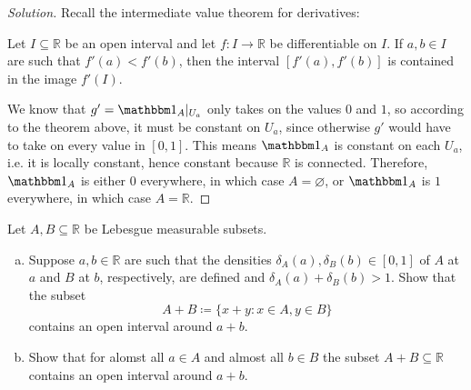 \documentclass[10pt]{article}
\providecommand{\RR}{\mathbb R}
\providecommand{\ind}{\mathbbm 1}
\providecommand{\ii}{\item}
\newenvironment{soln}{\begin{proof}[Solution]}{\end{proof}}
\begin{document}
\begin{soln}
    Recall the intermediate value theorem for derivatives:
    \begin{theorem*}
        Let $I\subseteq\RR$ be an open interval and let
	$f\colon I\to\RR$ be differentiable on $I$.
	If $a,b\in I$ are such that $f'(a)<f'(b)$,
	then the interval $[f'(a),f'(b)]$ is contained in the image $f'(I)$.
    \end{theorem*}
    We know that $g' = \ind_A|_{U_a}$ only takes on the values $0$ and $1$, so
    according to the theorem above, it must be constant on $U_a$,
    since otherwise $g'$ would have to take on every value in $[0,1]$.
    This means $\ind_A$ is constant on each $U_a$,
    i.e. it is locally constant, hence constant because $\RR$ is connected.
    Therefore, $\ind_A$ is either $0$ everywhere, in which case $A = \varnothing$,
    or $\ind_A$ is $1$ everywhere, in which case $A = \RR$.
\end{soln}

\begin{problem}
    Let $A,B\subseteq\RR$ be Lebesgue measurable subsets.
    \begin{enumerate}[(a)]
        \ii Suppose $a,b\in\RR$ are such that the densities
	$\delta_A(a),\delta_B(b)\in[0,1]$ of $A$ at $a$ and $B$ at $b$,
	respectively, are defined and $\delta_A(a) + \delta_B(b) > 1$.
	Show that the subset
	\begin{equation*}
	    A + B \coloneq \{ x + y : x\in A, y\in B \}
	\end{equation*}
	contains an open interval around $a+b$.
	\ii Show that for alomst all $a\in A$ and almost all $b\in B$
	the subset $A+B\subseteq\RR$ contains an open interval around $a+b$.
    \end{enumerate}
\end{problem}
\end{document}
